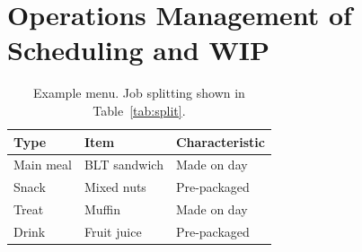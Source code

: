 \section{Operations Management of Scheduling and WIP}
\label{app:schedule}

\begin{table}[H]
\centering
\caption{Example menu. Job splitting shown in Table~\ref{tab:split}.}
\label{tab:menu}
\begin{tabular}{@{}lll@{}}
\toprule
Type      & Item                              & Characteristic \\ \midrule
Main meal & BLT sandwich & Made on day    \\
Snack     & Mixed nuts                        & Pre-packaged   \\
Treat     & Muffin                            & Made on day    \\
Drink     & Fruit juice                       & Pre-packaged   \\ \bottomrule
\end{tabular}
\end{table}

